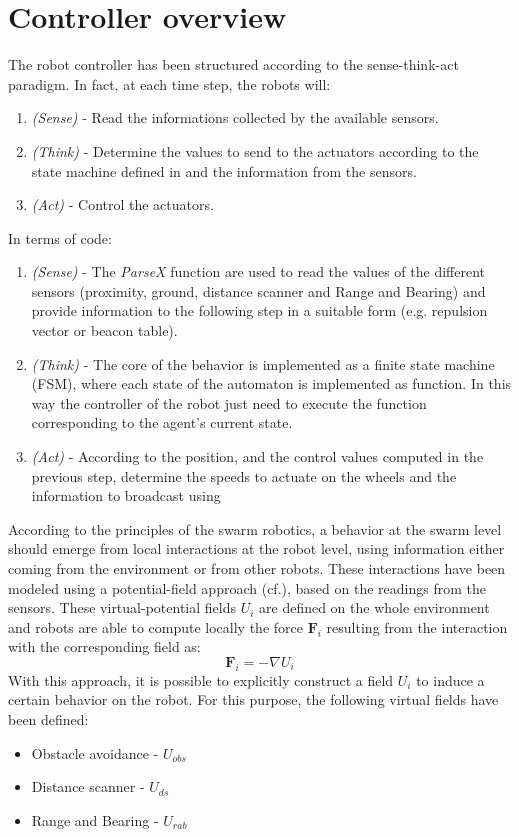 \section{Controller overview}
The robot controller has been structured according to the sense-think-act paradigm.
In fact, at each time step, the robots will:
\begin{enumerate}
  \item \emph{(Sense)} - Read the informations collected by the available sensors.
  \item \emph{(Think)} - Determine the values to send to the actuators according to the state machine defined in  and the information from the sensors.
  \item \emph{(Act)} - Control the actuators.
\end{enumerate}

In terms of code:
\begin{enumerate}
  \item \emph{(Sense)} - The \emph{ParseX} function are used to read the values of the different sensors (proximity, ground, distance scanner and Range and Bearing) and provide information to the following step in a suitable form (e.g. repulsion vector or beacon table).
  \item \emph{(Think)} - The core of the behavior is implemented as a finite state machine (FSM), where each state of the automaton is implemented as function.
  In this way the controller of the robot just need to execute the function corresponding to the agent's current state.
  \item \emph{(Act)} - According to the position, and the control values computed in the previous step, determine the speeds to actuate on the wheels and the information to broadcast using
\end{enumerate}

According to the principles of the swarm robotics, a behavior at the swarm level should emerge from local interactions at the robot level, using information either coming from the environment or from other robots.
These interactions have been modeled using a potential-field approach (cf.\cite{howard2002mobile}), based on the readings from the sensors.
These virtual-potential fields $U_i$ are defined on the whole environment and robots are able to compute locally the force $\mathbf{F}_i$ resulting from the interaction with the corresponding field as:
\begin{equation}
  \mathbf{F}_i = -\nabla U_i
\end{equation}
With this approach, it is possible to explicitly construct a field $U_i$ to induce a certain behavior on the robot.
For this purpose, the following virtual fields have been defined:
\begin{itemize}
  \item Obstacle avoidance - $U_{obs}$
  \item Distance scanner - $U_{ds}$
  \item Range and Bearing - $U_{rab}$
\end{itemize} 

